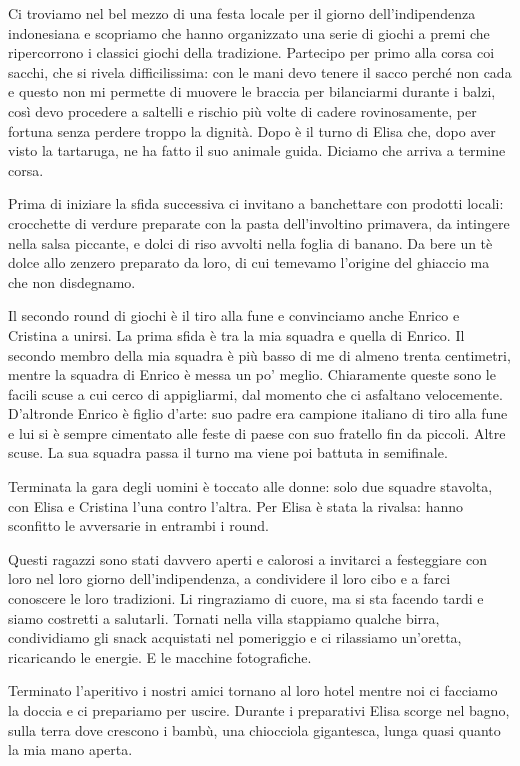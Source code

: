 Ci troviamo nel bel mezzo di una festa locale per il giorno dell'indipendenza indonesiana e scopriamo che hanno organizzato una serie di giochi a premi che ripercorrono i classici giochi della tradizione. Partecipo per primo alla corsa coi sacchi, che si rivela difficilissima: con le mani devo tenere il sacco perché non cada e questo non mi permette di muovere le braccia per bilanciarmi durante i balzi, così devo procedere a saltelli e rischio più volte di cadere rovinosamente, per fortuna senza perdere troppo la dignità. Dopo è il turno di Elisa che, dopo aver visto la tartaruga, ne ha fatto il suo animale guida. Diciamo che arriva a termine corsa.

Prima di iniziare la sfida successiva ci invitano a banchettare con prodotti locali: crocchette di verdure preparate con la pasta dell'involtino primavera, da intingere nella salsa piccante, e dolci di riso avvolti nella foglia di banano. Da bere un tè dolce allo zenzero preparato da loro, di cui temevamo l'origine del ghiaccio ma che non disdegnamo.

Il secondo round di giochi è il tiro alla fune e convinciamo anche Enrico e Cristina a unirsi. La prima sfida è tra la mia squadra e quella di Enrico. Il secondo membro della mia squadra è più basso di me di almeno trenta centimetri, mentre la squadra di Enrico è messa un po' meglio. Chiaramente queste sono le facili scuse a cui cerco di appigliarmi, dal momento che ci asfaltano velocemente. D'altronde Enrico è figlio d'arte: suo padre era campione italiano di tiro alla fune e lui si è sempre cimentato alle feste di paese con suo fratello fin da piccoli. Altre scuse. La sua squadra passa il turno ma viene poi battuta in semifinale.

Terminata la gara degli uomini è toccato alle donne: solo due squadre stavolta, con Elisa e Cristina l'una contro l'altra. Per Elisa è stata la rivalsa: hanno sconfitto le avversarie in entrambi i round.

Questi ragazzi sono stati davvero aperti e calorosi a invitarci a festeggiare con loro nel loro giorno dell'indipendenza, a condividere il loro cibo e a farci conoscere le loro tradizioni. Li ringraziamo di cuore, ma si sta facendo tardi e siamo costretti a salutarli. Tornati nella villa stappiamo qualche birra, condividiamo gli snack acquistati nel pomeriggio e ci rilassiamo un'oretta, ricaricando le energie. E le macchine fotografiche.

Terminato l'aperitivo i nostri amici tornano al loro hotel mentre noi ci facciamo la doccia e ci prepariamo per uscire. Durante i preparativi Elisa scorge nel bagno, sulla terra dove crescono i bambù, una chiocciola gigantesca, lunga quasi quanto la mia mano aperta.

